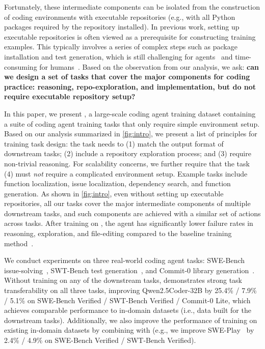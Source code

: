 \documentclass{article}
\theoremstyle{plain}
\theoremstyle{definition}
\theoremstyle{remark}
\begin{document}
Fortunately, these intermediate components can be isolated from the construction of coding environments with executable repositories (e.g., with all Python packages required by the repository installed).
In previous work, setting up executable repositories is often viewed as a prerequisite for constructing training examples. This typically involves a series of complex steps such as package installation and test generation, which is still challenging for agents~\cite{swe-play} and time-consuming for humans~\cite{swegym,swe-smith,R2EGym}.
Based on the observation from our analysis, we ask: \textbf{can we design a set of tasks that cover the major components for coding practice: reasoning, repo-exploration, and implementation, but do not require executable repository setup?}


In this paper, we present \methodName, a large-scale coding agent training dataset containing a suite of coding agent training tasks that only require simple environment setup.
Based on our analysis summarized in \autoref{fig:intro}, we present a list of principles for training task design: the task needs to 
(1) match the output format of downstream tasks;
(2) include a repository exploration process; and 
(3) require non-trivial reasoning.
For scalability concerns, we further require that the task (4) must \emph{not} require a complicated environment setup.
Example tasks include function localization, issue localization, dependency search, and function generation.
As shown in \autoref{fig:intro}, even without setting up executable repositories, all our tasks cover the major intermediate components of multiple downstream tasks, and such components are achieved with a similar set of actions across tasks. 
After training on \methodName, the agent has significantly lower failure rates in reasoning, exploration, and file-editing compared to the baseline training method~\cite{swegym}.


We conduct experiments on three real-world coding agent tasks: SWE-Bench issue-solving~\citep{swebench}, SWT-Bench test generation~\citep{swt-bench}, and Commit-0 library generation~\citep{commit0}.
Without training on any of the downstream tasks, \methodName demonstrates strong task transferability on all three tasks, improving Qwen2.5Coder-32B by 25.4\% / 7.9\% / 5.1\% on SWE-Bench Verified / SWT-Bench Verified / Commit-0 Lite, which achieves comparable performance to in-domain datasets (i.e., data built for the downstream tasks). 
Additionally, we also improve the performance of training on existing in-domain datasets by combining with \methodName (e.g., we improve SWE-Play~\citep{swe-play} by 2.4\% / 4.9\% on SWE-Bench Verified / SWT-Bench Verified).
\end{document}
